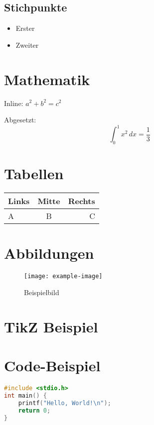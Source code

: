 \documentclass[11pt,a4paper,open=any]{scrbook} %
\begin{document}
\subsection{Stichpunkte}
\begin{itemize}
  \item Erster
  \item Zweiter
\end{itemize}

\section{Mathematik}
Inline: $a^2 + b^2 = c^2$  

Abgesetzt:
\[
  \int_0^1 x^2 \, dx = \frac{1}{3}
\]

\section{Tabellen}
\begin{tabular}{|l|c|r|}
\hline
Links & Mitte & Rechts \\
\hline
A & B & C \\
\hline
\end{tabular}

\section{Abbildungen}
\begin{figure}[h]
    \centering
    \texttt{[image: example-image]}
    \caption{Beispielbild}
\end{figure}

\section{TikZ Beispiel}

\section{Code-Beispiel}
\begin{lstlisting}[language=C, caption={Hello World in C}]
#include <stdio.h>
int main() {
    printf("Hello, World!\n");
    return 0;
}
\end{lstlisting}
\end{document}
